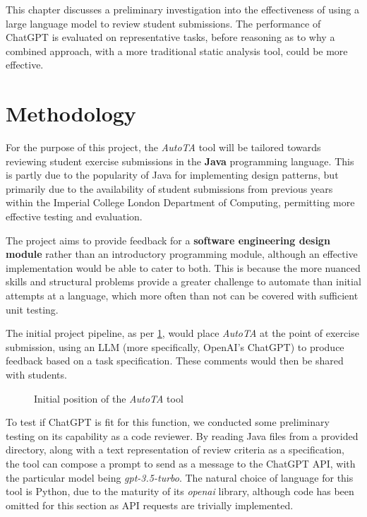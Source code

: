 \label{chapter:part1}

This chapter discusses a preliminary investigation into the effectiveness of using a large language model to review student submissions. The performance of ChatGPT is evaluated on representative tasks, before reasoning as to why a combined approach, with a more traditional static analysis tool, could be more effective.

\section{Methodology}
For the purpose of this project, the \emph{AutoTA} tool will be tailored towards reviewing student exercise submissions in the \textbf{Java} programming language. This is partly due to the popularity of Java for implementing design patterns, but primarily due to the availability of student submissions from previous years within the Imperial College London Department of Computing, permitting more effective testing and evaluation.

The project aims to provide feedback for a \textbf{software engineering design module} rather than an introductory programming module, although an effective implementation would be able to cater to both. This is because the more nuanced skills and structural problems provide a greater challenge to automate than initial attempts at a language, which more often than not can be covered with sufficient unit testing.

The initial project pipeline, as per \cref{fig:pipeline}, would place \emph{AutoTA} at the point of exercise submission, using an LLM (more specifically, OpenAI's ChatGPT) to produce feedback based on a task specification. These comments would then be shared with students.

\begin{figure}[H]
    \centering
    
    \caption{Initial position of the \emph{AutoTA} tool}
    \label{fig:pipeline}
\end{figure}

To test if ChatGPT is fit for this function, we conducted some preliminary testing on its capability as a code reviewer. By reading Java files from a provided directory, along with a text representation of review criteria as a specification, the tool can compose a prompt to send as a message to the ChatGPT API, with the particular model being \emph{gpt-3.5-turbo}. The natural choice of language for this tool is Python, due to the maturity of its \emph{openai} library, although code has been omitted for this section as API requests are trivially implemented.

